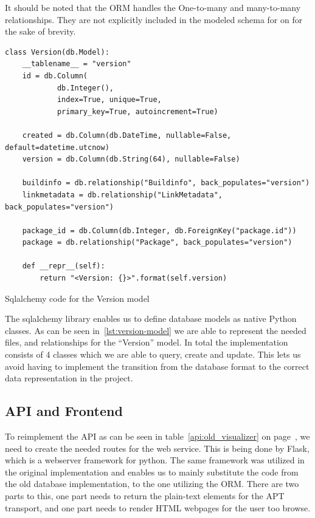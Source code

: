 \documentclass[../Main/thesis.tex]{subfiles}
\begin{document}
It should be noted that the ORM handles the One-to-many and many-to-many
relationships. They are not explicitly included in the modeled schema for on 
for the sake of brevity.

\begin{listing}[H]
\begin{verbatim}
class Version(db.Model):
    __tablename__ = "version"
    id = db.Column(
            db.Integer(),
            index=True, unique=True, 
            primary_key=True, autoincrement=True)

    created = db.Column(db.DateTime, nullable=False, default=datetime.utcnow)
    version = db.Column(db.String(64), nullable=False)

    buildinfo = db.relationship("Buildinfo", back_populates="version")
    linkmetadata = db.relationship("LinkMetadata", back_populates="version")

    package_id = db.Column(db.Integer, db.ForeignKey("package.id"))
    package = db.relationship("Package", back_populates="version")

    def __repr__(self):
        return "<Version: {}>".format(self.version)
\end{verbatim}
\caption{Sqlalchemy code for the Version model}
\label{lst:version-model}
\end{listing}

The sqlalchemy library enables us to define database models as native Python
classes. As can be seen in~\ref{lst:version-model} we are able to represent the
needed files, and relationships for the ``Version'' model. In total the
implementation consists of 4 classes which we are able to query, create and
update. This lets us avoid having to implement the transition from the database
format to the correct data representation in the project.

\subsection*{API and Frontend}%
\label{sub:api_and_frontend}

To reimplement the API as can be seen in table~\ref{api:old_visualizer} on
page~\pageref{api:old_visualizer}, we need to create the needed routes for the
web service. This is being done by Flask, which is a webserver framework for
python. The same framework was utilized in the original implementation and
enables us to mainly substitute the code from the old database implementation,
to the one utilizing the ORM. There are two parts to this, one part needs to
return the plain-text elements for the APT transport, and one part needs to
render HTML webpages for the user too browse.
\end{document}
